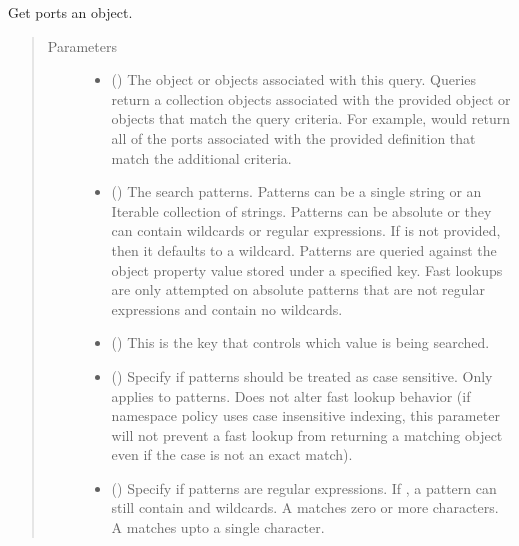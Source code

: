 \documentclass[letterpaper,10pt,english,openany,oneside]{sphinxmanual}
\begin{document}
\begin{fulllineitems}
\label{\detokenize{reference/classes/generated/spydrnet.get_ports:spydrnet.get_ports}}
Get ports  an object.
\begin{quote}\begin{description}
\item[{Parameters}] \leavevmode\begin{itemize}
\item {} 
 () \textendash{} The object or objects associated with this query. Queries return a collection objects associated with the
provided object or objects that match the query criteria. For example,  would
return all of the ports associated with the provided definition that match the additional criteria.

\item {} 
 () \textendash{} The search patterns. Patterns can be a single string or an Iterable collection of strings. Patterns can be
absolute or they can contain wildcards or regular expressions. If  is not provided, then it defaults
to a wildcard. Patterns are queried against the object property value stored under a specified key. Fast lookups
are only attempted on absolute patterns that are not regular expressions and contain no wildcards.

\item {} 
 () \textendash{} This is the key that controls which value is being searched.

\item {} 
 () \textendash{} Specify if patterns should be treated as case sensitive. Only applies to patterns. Does not alter fast lookup
behavior (if namespace policy uses case insensitive indexing, this parameter will not prevent a fast lookup
from returning a matching object even if the case is not an exact match).

\item {} 
 () \textendash{} Specify if patterns are regular expressions. If , a pattern can still contain \sphinxtitleref{*} and  wildcards. A
\sphinxtitleref{*} matches zero or more characters. A  matches upto a single character.


\end{itemize}
\end{description}
\end{quote}
\end{fulllineitems}
\end{document}
